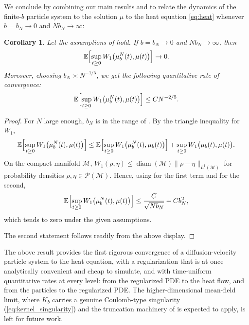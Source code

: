 \documentclass[11pt]{article}
\newtheorem{corollary}[theorem]{Corollary}
\theoremstyle{definition}
\def\M{\mathcal M}
\begin{document}
We conclude by combining our main results  and  to relate the dynamics of the finite-$b$ particle system to the solution $\mu$ to the heat equation \eqref{eq:heat} whenever $b=b_N\to0$ and $Nb_N\to\infty$: 

\begin{corollary}
Let the assumptions of  hold. If $b=b_N\to0$ and $N b_N\to\infty$, then
\[
\mathbb E\Bigl[\sup_{t\ge0}W_1\bigl(\mu_b^N(t),\mu(t)\bigr)\Bigr]\to0.
\]
Moreover, choosing $b_N\asymp N^{-1/5}$, we get the following quantitative rate of convergence:
\[
\mathbb E\Bigl[\sup_{t\ge0}W_1\bigl(\mu_b^N(t),\mu(t)\bigr)\Bigr]\le C N^{-2/5}.
\]
\end{corollary}

\begin{proof}
For \(N\) large enough, \(b_N\) is in the range of
. By the triangle inequality for
\(W_1\),
\[
\mathbb E\Bigl[\sup_{t\ge0}W_1\bigl(\mu_b^N(t),\mu(t)\bigr)\Bigr]
\le
\mathbb E\Bigl[\sup_{t\ge0}W_1\bigl(\mu_b^N(t),\mu_b(t)\bigr)\Bigr]
+
\sup_{t\ge0}W_1\bigl(\mu_b(t),\mu(t)\bigr).
\]
On the compact manifold \(\M\), \(W_1(\rho,\eta)\le
\operatorname{diam}(\M)\|\rho-\eta\|_{L^1(\M)}\) for probability densities $\rho,\eta\in \mathcal{P}(\mathcal{M})$. Hence, using 
for the first term and  for the second,
\[
\mathbb E\Bigl[\sup_{t\ge0}W_1\bigl(\mu_b^N(t),\mu(t)\bigr)\Bigr]
\le
\frac{C}{\sqrt{N b_N}}+C b_N^2,
\]
which tends to zero under the given assumptions. 

The second statement follows readily from the above display.
\end{proof}
The above result provides the first rigorous
convergence of a diffusion-velocity particle system to the heat equation, with
a regularization that is at once analytically convenient and cheap to simulate,
and with time-uniform quantitative rates at every level: from the regularized
PDE to the heat flow, and from the particles to the regularized PDE. The
higher-dimensional mean-field limit, where $K_b$ carries a genuine
Coulomb-type singularity (\eqref{eq:kernel_singularity}) and the truncation
machinery of \cite{duerinckx_serfaty_2020} is expected to apply, is left for future work.
\end{document}

